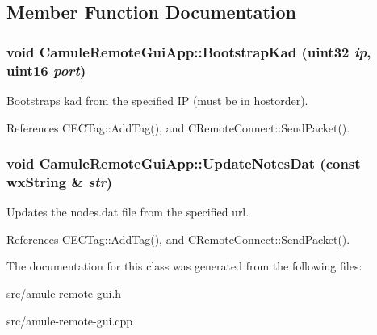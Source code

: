 \subsection{Member Function Documentation}
\subsubsection[{BootstrapKad}]{\setlength{\rightskip}{0pt plus 5cm}void CamuleRemoteGuiApp::BootstrapKad (uint32 {\em ip}, \/  uint16 {\em port})}\label{classCamuleRemoteGuiApp_a77cd711dfbdc53c9716fe108103e4dd8}


Bootstraps kad from the specified IP (must be in hostorder). 

References CECTag::AddTag(), and CRemoteConnect::SendPacket().
\subsubsection[{UpdateNotesDat}]{\setlength{\rightskip}{0pt plus 5cm}void CamuleRemoteGuiApp::UpdateNotesDat (const wxString \& {\em str})}\label{classCamuleRemoteGuiApp_ae496afde6f18148caaa88270bf6ade53}


Updates the nodes.dat file from the specified url. 

References CECTag::AddTag(), and CRemoteConnect::SendPacket().

The documentation for this class was generated from the following files:\begin{DoxyCompactItemize}
\item 
src/amule-\/remote-\/gui.h\item 
src/amule-\/remote-\/gui.cpp\end{DoxyCompactItemize}
